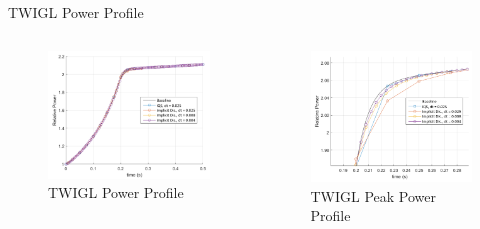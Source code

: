 \documentclass[8pt,xcolor=dvipnames]{beamer}
\begin{document}
\begin{frame}{TWIGL Power Profile}

\begin{columns}

\begin{figure}
\includegraphics[width=\linewidth]{figures/TWIGL_power_plot.png}
\caption{TWIGL Power Profile}
\end{figure}

\begin{figure}
\includegraphics[width=\linewidth]{figures/TWIGL_power_plot2.png}
\caption{TWIGL Peak Power Profile}
\end{figure}

\end{columns}

\end{frame}
\end{document}
